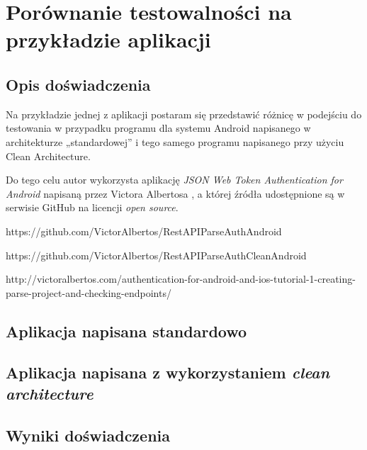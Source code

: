 \chapter{Porównanie testowalności na przykładzie aplikacji}
\label{analiza_testow}

\section{Opis doświadczenia}
Na przykładzie jednej z aplikacji postaram się przedstawić różnicę w podejściu do testowania w przypadku programu dla systemu Android napisanego w architekturze „standardowej” i tego samego programu napisanego przy użyciu Clean Architecture.

Do tego celu autor wykorzysta aplikację \textit{JSON Web Token Authentication for Android} napisaną przez Victora Albertosa , a której źródła udostępnione są w serwisie GitHub na licencji \textit{open source}.

https://github.com/VictorAlbertos/RestAPIParseAuthAndroid

https://github.com/VictorAlbertos/RestAPIParseAuthCleanAndroid

http://victoralbertos.com/authentication-for-android-and-ios-tutorial-1-creating-parse-project-and-checking-endpoints/



\section{Aplikacja napisana standardowo}

\section{Aplikacja napisana z wykorzystaniem \textit{clean architecture}}

\section{Wyniki doświadczenia}
